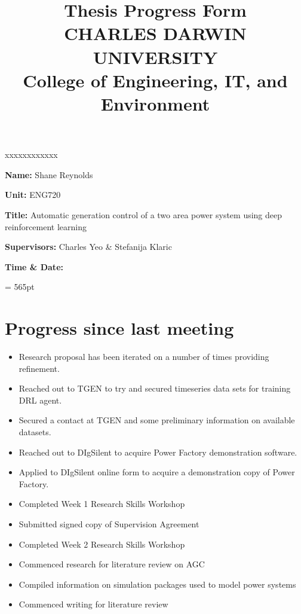 \documentclass[12pt]{article}
\title{	
		Thesis Progress Form\\
		CHARLES DARWIN UNIVERSITY\\
		College of Engineering, IT, and Environment
	  }
\author{}
\date{}
\begin{document}
	
	\maketitle
	
	\begin{namelist}{xxxxxxxxxxxx}
		\item[{\bf Name:}]
			Shane Reynolds
		\item[{\bf Unit:}]
			ENG720
		\item[{\bf Title:}]
			Automatic generation control of a two area power system using deep reinforcement learning
		\item[{\bf Supervisors:}]
			Charles Yeo \& Stefanija Klaric
		\item[{\bf Time \& Date:}]
			
	\end{namelist}
	
	\pagestyle{plain} %
	\textheight = 565pt %
	
	\section{Progress since last meeting}
	\begin{itemize}
		\item Research proposal has been iterated on a number of times providing refinement.
		\item Reached out to TGEN to try and secured timeseries data sets for training DRL agent.
		\item Secured a contact at TGEN and some preliminary information on available datasets.
		\item Reached out to DIgSilent to acquire Power Factory demonstration software.
		\item Applied to DIgSilent online form to acquire a demonstration copy of Power Factory.
		\item Completed Week 1 Research Skills Workshop
		\item Submitted signed copy of Supervision Agreement
		\item Completed Week 2 Research Skills Workshop
		\item Commenced research for literature review on AGC
		\item Compiled information on simulation packages used to model power systems
		\item Commenced writing for literature review
	\end{itemize}
	
\end{document}
